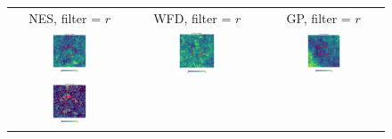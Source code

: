 \documentclass[preprintm,linenumbers]{aastex631}
\begin{document}
  
  	\begin{figure}
			\centering
			\begin{tabular}{  c c c}
                 NES, filter = $r$ & WFD, filter = $r$ & GP, filter = $r$ \\
				\includegraphics[width=0.3\textwidth]{results/skymaps_cutout/skymaps_cutout_first_year_one_snap_v4_0_10yrs_db_noDD_noTwi_nside-256_CountMetric_r_NES_noDD_noTwi.pdf} &
				\includegraphics[width=0.3\textwidth]{results/skymaps_cutout/skymaps_cutout_first_year_one_snap_v4_0_10yrs_db_noDD_noTwi_nside-256_CountMetric_r_WFD_noDD_noTwi.pdf} &
				\includegraphics[width=0.3\textwidth]{results/skymaps_cutout/skymaps_cutout_first_year_one_snap_v4_0_10yrs_db_noDD_noTwi_nside-256_CountMetric_r_GP_noDD_noTwi.pdf} \\
				\includegraphics[width=0.3\textwidth]{results/skymaps_cutout/skymaps_cutout_first_year_one_snap_v4_0_10yrs_db_noDD_noTwi_tscale-3_nside-256_doAllTemplateMetrics_reduceCount_r_NES_noDD_noTwi.pdf} &

\end{tabular}
\end{figure}
\end{document}
